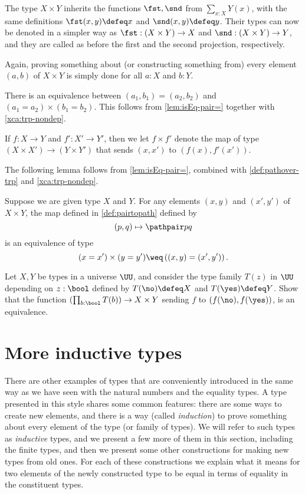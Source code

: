 The type $X \times Y$ inherits the functions $\fst,\snd$ from
$\sum_{x:X} Y(x)$, with the same definitions $\fst(x,y)\defeq x$
and $\snd(x,y)\defeq y$. Their types can now be denoted in a
simpler way as $\fst: (X \times Y)\to X$ and
$\snd: (X \times Y)\to Y$, and they are called as before the
first and the second projection, respectively.

Again, proving something about (or constructing something from) every
element $(a,b)$ of $X \times Y$ is simply done for all $a:X$ and $b:Y$.

There is an equivalence between $(a_1,b_1)=(a_2,b_2)$ and $(a_1=a_2) \times (b_1=b_2)$.
This follows from \cref{lem:isEq-pair=} together with \cref{xca:trp-nondep}.

If $f: X \to Y$ and $f': X' \to Y'$, then we let
$f\times f'$ denote the map of type $(X\times X') \to (Y\times Y')$
that sends $(x,x')$ to $(f(x),f'(x'))$.

The following lemma follows from \cref{lem:isEq-pair=}, combined with \cref{def:pathover-trp} and \cref{xca:trp-nondep}.

\begin{lemma}\label{lem:isEq-pair-bin=}
  Suppose we are given type $X$ and $Y$.
  For any elements $(x,y)$ and $(x',y')$ of $X \times Y$,
  the map defined in \cref{def:pairtopath} defined by
  \[
    (p,q) \mapsto \pathpair p q
  \]
  is an equivalence of type
  \[
    ( x = x' ) \times (y = y') \weq \left( (x,y) = (x',y') \right).
  \]
\end{lemma}

\begin{xca}\label{xca:binary-prod-equiv}
  Let $X,Y$ be types in a universe $\UU$, and consider the type family
  $T(z)$ in $\UU$ depending on $z:\bool$ defined by
  $T(\no)\defeq X$ and $T(\yes) \defeq Y$.
  Show that the function $(\prod_{b:\bool}T(b))\to X\times Y$
  sending $f$ to $(f(\no),f(\yes))$, is an equivalence.
\end{xca}

\section{More inductive types}
\label{sec:inductive-types}

There are other examples of types that are conveniently introduced
in the same way as we have seen with the natural numbers and the equality types.
A type
presented in this style shares some common features: there are some ways to create new elements, and there is a way (called \emph{induction}) to
prove something about every element of the type (or family of types).  We will refer to such types as \emph{inductive} types, and we present a
few more of them in this section, including the finite types, and then we present some other constructions for making new types from old ones.
For each of these constructions we explain what it means for two elements of the newly constructed type to be equal in terms of equality in the
constituent types.


